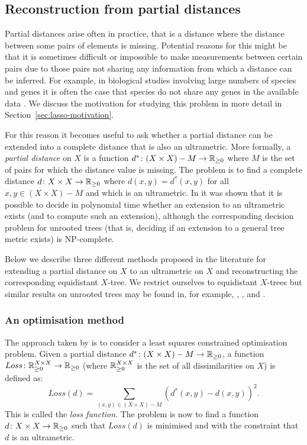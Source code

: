 \subsection{Reconstruction from partial distances}
\label{sec:constr-from-part}

Partial distances arise often in practice, that is a distance where the
distance between some pairs of elements is missing.  Potential reasons for
this might be that it is sometimes difficult or impossible to make
measurements between certain pairs due to those pairs not sharing any
information from which a distance can be inferred.  For example, in biological
studies involving large numbers of species and genes it is often the case that
species do not share any genes in the available data
\cite{criscuolo2008fastnj}.  We discuss the motivation for studying this
problem in more detail in Section~\ref{sec:lasso-motivation}.

For this reason it becomes useful to ask whether a partial distance can be
extended into a complete distance that is also an ultrametric.  More formally,
a \textit{partial distance} on $X$ is a function $d^* \colon (X \times X) - M
\to {\mathbb R}_{\geq 0}$ where $M$ is the set of pairs for which the distance value is
missing.  The problem is to find a complete distance $d \colon X \times X \to
{\mathbb R}_{\geq 0}$ where $d(x,y) = d^*(x,y)$ for all $x,y \in (X \times X) - M$ and which
is an ultrametric.  In \cite{farach1995robust} it was shown that it is
possible to decide in polynomial time whether an extension to an ultrametric
exists (and to compute such an extension), although the corresponding decision
problem for unrooted trees (that is, deciding if an extension to a general
tree metric exists) is NP-complete.

Below we describe three different methods proposed in the literature for
extending a partial distance on $X$ to an ultrametric on $X$ and
reconstructing the corresponding equidistant $X$-tree.  We restrict ourselves
to equidistant $X$-trees but similar results on unrooted trees may be found
in, for example, \cite{guenoche1999approximations}, \cite{farach1995robust},
\cite{makarenkov2001nouvelle} and \cite{guenoche2004extension}.

\subsubsection{An optimisation method}
\label{sec:part-dist-optim-method}

The approach taken by \citet{de1984ultrametric} is to consider a least squares
constrained optimisation problem.  Given a partial distance $d^* \colon (X
\times X) - M \to {\mathbb R}_{\geq 0}$, a function $Loss \colon {\mathbb R}_{\geq 0}^{X \times X} \to
{\mathbb R}_{\geq 0}$ (where ${\mathbb R}_{\geq 0}^{X \times X}$ is the set of all dissimilarities on $X$)
is defined as:
\begin{equation*}
  \label{eq:partial-dist-least-squares}
  Loss(d) = \sum_{(x,y) \in (X \times X) - M} (d^*(x,y)-d(x,y))^2.
\end{equation*}
This is called the \textit{loss function}.  The problem is now to find a
function $d \colon X \times X \to {\mathbb R}_{\geq 0}$ such that $Loss(d)$ is minimised and
with the constraint that $d$ is an ultrametric.

